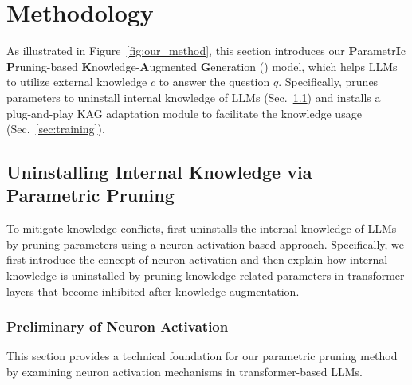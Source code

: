 \section{Methodology}

As illustrated in Figure~\ref{fig:our_method},  this section introduces our \textbf{P}arametr\textbf{I}c \textbf{P}runing-based \textbf{K}nowledge-\textbf{A}ugmented \textbf{G}eneration (\method{}) model, which helps LLMs to utilize external knowledge $c$ to answer the question $q$. Specifically, \method{} prunes parameters to uninstall internal knowledge of LLMs (Sec.~\ref{sec:param_pruning}) and installs a plug-and-play KAG adaptation module to facilitate the knowledge usage (Sec.~\ref{sec:training}).


\subsection{Uninstalling Internal Knowledge via Parametric Pruning}
\label{sec:param_pruning}
To mitigate knowledge conflicts, \method{} first uninstalls the internal knowledge of LLMs by pruning parameters using a neuron activation-based approach. Specifically, we first introduce the concept of neuron activation and then explain how internal knowledge is uninstalled by pruning knowledge-related parameters in transformer layers that become inhibited after knowledge augmentation.




\subsubsection{Preliminary of Neuron Activation} 
This section provides a technical foundation for our parametric pruning method by examining neuron activation mechanisms in transformer-based LLMs.

